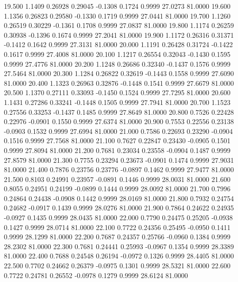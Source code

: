   19.500   1.1409   0.26928   0.29045  -0.1308   0.1724   0.9999  27.0273  81.0000
  19.600   1.1356   0.26823   0.29580  -0.1330   0.1719   0.9999  27.0441  81.0000
  19.700   1.1260   0.26519   0.30229  -0.1361   0.1708   0.9999  27.0837  81.0000
  19.800   1.1174   0.26259   0.30938  -0.1396   0.1674   0.9999  27.2041  81.0000
  19.900   1.1172   0.26316   0.31371  -0.1412   0.1642   0.9999  27.3131  81.0000
  20.000   1.1191   0.26428   0.31724  -0.1422   0.1617   0.9999  27.4008  81.0000
  20.100   1.1217   0.26554   0.32043  -0.1430   0.1595   0.9999  27.4776  81.0000
  20.200   1.1248   0.26686   0.32340  -0.1437   0.1576   0.9999  27.5464  81.0000
  20.300   1.1284   0.26822   0.32619  -0.1443   0.1558   0.9999  27.6090  81.0000
  20.400   1.1323   0.26963   0.32876  -0.1448   0.1541   0.9999  27.6679  81.0000
  20.500   1.1370   0.27111   0.33093  -0.1450   0.1524   0.9999  27.7295  81.0000
  20.600   1.1431   0.27286   0.33241  -0.1448   0.1505   0.9999  27.7941  81.0000
  20.700   1.1523   0.27556   0.33253  -0.1437   0.1485   0.9999  27.8649  81.0000
  20.800   0.7526   0.22428   0.22976  -0.0901   0.1550   0.9999  27.6374  81.0000
  20.900   0.7553   0.22556   0.23138  -0.0903   0.1532   0.9999  27.6994  81.0000
  21.000   0.7586   0.22693   0.23290  -0.0904   0.1516   0.9999  27.7568  81.0000
  21.100   0.7627   0.22847   0.23430  -0.0905   0.1501   0.9999  27.8094  81.0000
  21.200   0.7681   0.23034   0.23558  -0.0904   0.1487   0.9999  27.8579  81.0000
  21.300   0.7755   0.23294   0.23673  -0.0901   0.1474   0.9999  27.9031  81.0000
  21.400   0.7876   0.23756   0.23776  -0.0897   0.1462   0.9999  27.9477  81.0000
  21.500   0.8103   0.24991   0.23957  -0.0891   0.1446   0.9999  28.0031  81.0000
  21.600   0.8055   0.24951   0.24199  -0.0899   0.1444   0.9999  28.0092  81.0000
  21.700   0.7996   0.24864   0.24438  -0.0908   0.1442   0.9999  28.0169  81.0000
  21.800   0.7932   0.24754   0.24682  -0.0917   0.1439   0.9999  28.0276  81.0000
  21.900   0.7864   0.24622   0.24935  -0.0927   0.1435   0.9999  28.0435  81.0000
  22.000   0.7790   0.24475   0.25205  -0.0938   0.1427   0.9999  28.0714  81.0000
  22.100   0.7722   0.24356   0.25495  -0.0950   0.1411   0.9999  28.1299  81.0000
  22.200   0.7687   0.24357   0.25766  -0.0960   0.1384   0.9999  28.2302  81.0000
  22.300   0.7681   0.24441   0.25993  -0.0967   0.1354   0.9999  28.3389  81.0000
  22.400   0.7688   0.24548   0.26194  -0.0972   0.1326   0.9999  28.4405  81.0000
  22.500   0.7702   0.24662   0.26379  -0.0975   0.1301   0.9999  28.5321  81.0000
  22.600   0.7722   0.24781   0.26552  -0.0978   0.1279   0.9999  28.6124  81.0000
